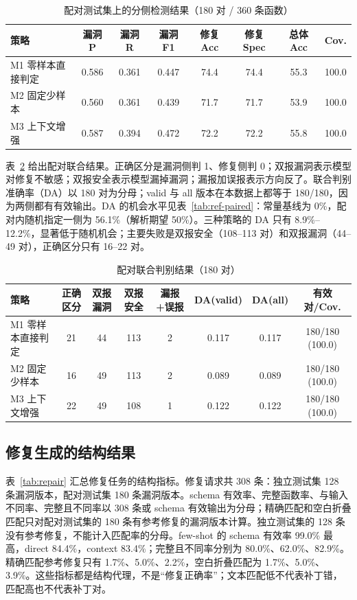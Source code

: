 \documentclass[conference]{IEEEtran}
\begin{document}
\begin{table}[t]
\caption{配对测试集上的分侧检测结果（180 对 / 360 条函数）}
\label{tab:pair-detection}
\centering
\small
\begin{tabular}{@{}lccccccc@{}}
\toprule
策略 & 漏洞 P & 漏洞 R & 漏洞 F1 & 修复 Acc & 修复 Spec & 总体 Acc & Cov.\\
\midrule
M1 零样本直接判定 & 0.586 & 0.361 & 0.447 & 74.4 & 74.4 & 55.3 & 100.0\\
M2 固定少样本 & 0.560 & 0.361 & 0.439 & 71.7 & 71.7 & 53.9 & 100.0\\
M3 上下文增强 & 0.587 & 0.394 & 0.472 & 72.2 & 72.2 & 55.8 & 100.0\\
\bottomrule
\end{tabular}
\end{table}

表~\ref{tab:pair-joint} 给出配对联合结果。正确区分是漏洞侧判 1、修复侧判 0；双报漏洞表示模型对修复不敏感；双报安全表示模型漏掉漏洞；漏报加误报表示方向反了。联合判别准确率（DA）以 180 对为分母；valid 与 all 版本在本数据上都等于 180/180，因为两侧都有有效输出。DA 的机会水平见表~\ref{tab:ref-paired}：常量基线为 0\%，配对内随机指定一侧为 56.1\%（解析期望 50\%）。三种策略的 DA 只有 8.9\%--12.2\%，显著低于随机机会；主要失败是双报安全（108--113 对）和双报漏洞（44--49 对），正确区分只有 16--22 对。

\begin{table}[t]
\caption{配对联合判别结果（180 对）}
\label{tab:pair-joint}
\centering
\small
\begin{tabular}{@{}lccccccc@{}}
\toprule
策略 & 正确区分 & 双报漏洞 & 双报安全 & 漏报+误报 & DA(valid) & DA(all) & 有效对/Cov.\\
\midrule
M1 零样本直接判定 & 21 & 44 & 113 & 2 & 0.117 & 0.117 & 180/180 (100.0)\\
M2 固定少样本 & 16 & 49 & 113 & 2 & 0.089 & 0.089 & 180/180 (100.0)\\
M3 上下文增强 & 22 & 49 & 108 & 1 & 0.122 & 0.122 & 180/180 (100.0)\\
\bottomrule
\end{tabular}
\end{table}

\subsection{修复生成的结构结果}
表~\ref{tab:repair} 汇总修复任务的结构指标。修复请求共 308 条：独立测试集 128 条漏洞版本，配对测试集 180 条漏洞版本。schema 有效率、完整函数率、与输入不同率、完整且不同率以 308 条或 schema 有效输出为分母；精确匹配和空白折叠匹配只对配对测试集的 180 条有参考修复的漏洞版本计算。独立测试集的 128 条没有参考修复，不能计入匹配率的分母。few-shot 的 schema 有效率 99.0\% 最高，direct 84.4\%，context 83.4\%；完整且不同率分别为 80.0\%、62.0\%、82.9\%。精确匹配参考修复只有 1.7\%、5.0\%、2.2\%，空白折叠匹配为 1.7\%、5.0\%、3.9\%。这些指标都是结构代理，不是“修复正确率”；文本匹配低不代表补丁错，匹配高也不代表补丁对。
\end{document}
